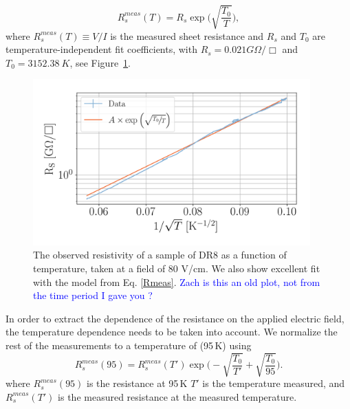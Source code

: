 \documentclass[a4paper,12pt]{article}
\newcommand{\RI}[1]{\textcolor{blue}{#1}}
\begin{document}
\begin{equation}
\label{Rmeas}
R_{s}^{meas}(T)=R_s\exp\bigg(\sqrt{\frac{T_0}{T}}\bigg),
\end{equation}
where $R_{s}^{meas}(T)\equiv V/I$ is the measured sheet resistance and $R_{s}$ and $T_0$ are temperature-independent fit coefficients, with $R_s =0.021 G\Omega/\Box$ and $T_0 = 3152.38~K$, see Figure~\ref{fig:cooldown}. 

\begin{figure}
\centering
\includegraphics[width=0.95\textwidth]{temp_sheetRes_dr8_cooldown.png}
\caption{The observed resistivity of a sample of DR8 as a function of temperature, taken at a field of 80 V/cm. We also show excellent fit with the model from Eq. \ref{Rmeas}. \RI{Zach is this an old plot, not from the time period I gave you ?}}
\label{fig:cooldown}
\end{figure}
In order to extract the dependence of the resistance on the applied electric field, the temperature dependence needs to be taken into account. We normalize the rest of the measurements to a temperature of (95\,K) using 
\begin{equation}
R_{s}^{meas}(95)=R_{s}^{meas}(T')\exp\bigg(-\sqrt{\frac{T_0}{T'}}+\sqrt{\frac{T_0}{95}}\bigg).
\end{equation}
where $R_s^{meas}(95)$ is the resistance at 95\,K $T'$ is the temperature measured, and $R_{s}^{meas}(T')$ is the measured resistance at the measured temperature. 
\end{document}
